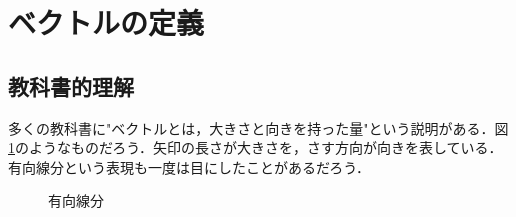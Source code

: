 %
%
%
%
%
% 

    \section{ベクトルの定義}
    \subsection{教科書的理解}
    多くの教科書に"ベクトルとは，大きさと向きを持った量"という説明がある．図\ref{fig:vector_yukosenbun}のようなものだろう．矢印の長さが大きさを，さす方向が向きを表している．有向線分という表現も一度は目にしたことがあるだろう．
    \begin{figure}[htbp]
        \begin{center}
        \end{center}
        \caption{有向線分}
        \label{fig:vector_yukosenbun}
    \end{figure}

